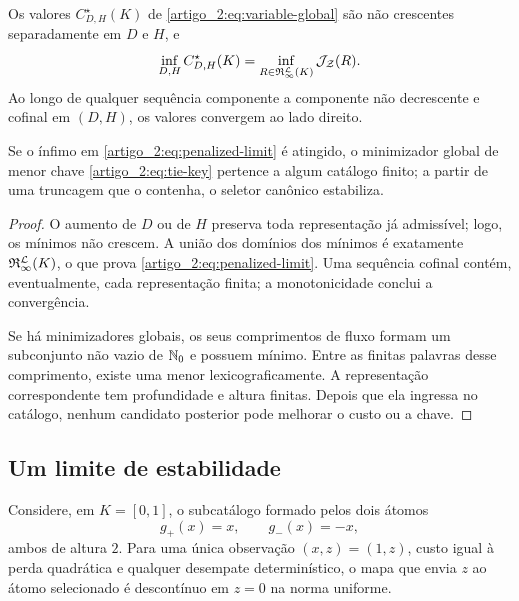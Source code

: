 \begin{proposition}\label{map:artigo_2:9.4}
\label{artigo_2:prop:truncation-convergence}
Os valores $C_{D,H}^{\star}(K)$ de \eqref{artigo_2:eq:variable-global} são não
crescentes separadamente em $D$ e $H$, e
\begin{equation}
 \inf_{D,H}C_{D,H}^{\star}(K)
 =\inf_{R\in\mathfrak{R}_{\infty}^{\mathcal{L}}(K)}
   \mathcal{J}_{\mathcal Z}(R).
 \label{artigo_2:eq:penalized-limit}
\end{equation}
Ao longo de qualquer sequência componente a componente não decrescente e
cofinal em $(D,H)$, os valores convergem ao lado direito.

Se o ínfimo em \eqref{artigo_2:eq:penalized-limit} é atingido, o minimizador global de
menor chave \eqref{artigo_2:eq:tie-key} pertence a algum catálogo finito; a partir de
uma truncagem que o contenha, o seletor canônico estabiliza.
\end{proposition}

\begin{proof}
O aumento de $D$ ou de $H$ preserva toda representação já admissível; logo, os
mínimos não crescem. A união dos domínios dos mínimos é exatamente
$\mathfrak{R}_{\infty}^{\mathcal{L}}(K)$, o que prova
\eqref{artigo_2:eq:penalized-limit}. Uma sequência cofinal contém, eventualmente, cada
representação finita; a monotonicidade conclui a convergência.

Se há minimizadores globais, os seus comprimentos de fluxo formam um subconjunto
não vazio de $\mathbb{N}_0$ e possuem mínimo. Entre as finitas palavras desse
comprimento, existe uma menor lexicograficamente. A representação
correspondente tem profundidade e altura finitas. Depois que ela ingressa no
catálogo, nenhum candidato posterior pode melhorar o custo ou a chave.
\end{proof}

\subsection{Um limite de estabilidade}

\begin{proposition}\label{map:artigo_2:9.5}
\label{artigo_2:prop:instability}
Considere, em $K=[0,1]$, o subcatálogo formado pelos dois átomos
\[
 g_+(x)=x,\qquad g_-(x)=-x,
\]
ambos de altura $2$. Para uma única observação $(x,z)=(1,z)$, custo igual à
perda quadrática e qualquer desempate determinístico, o mapa que envia $z$ ao
átomo selecionado é descontínuo em $z=0$ na norma uniforme.
\end{proposition}


